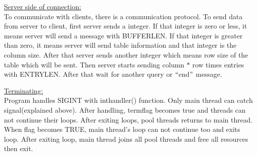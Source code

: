\documentclass[12pt]{report}
\renewcommand{\_}{\kern-1.5pt\textunderscore\kern-1.5pt}
\begin{document}
\vspace{\baselineskip}
\begin{FlushLeft}
\uline{Server side of connection:}\\
To communicate with clients, there is a communication protocol. To send data from server to client, first server sends a integer. If that integer is zero or less, it means server will send a message with BUFFER\_LEN. If that integer is greater than zero, it means server will send table information and that integer is the column size. After that server sends another integer which means row size of the table which will be sent. Then server starts sending column $\ast$  row times entries with ENTRY\_LEN. After that wait for another query or $``$end$"$  message.
\end{FlushLeft}

\vspace{\baselineskip}
\begin{FlushLeft}
\uline{Terminating:}\\
Program handles SIGINT with int\_handler() function. Only main thread can catch signal(explained above). After handling, term\_flag becomes true and threads can not continue their loops. After exiting loops, pool threads returns to main thread. When flag becomes TRUE, main thread’s loop can not continue too and exits loop. After exiting loop, main thread joins all pool threads and free all resources then exit.
\end{FlushLeft}
\end{document}
